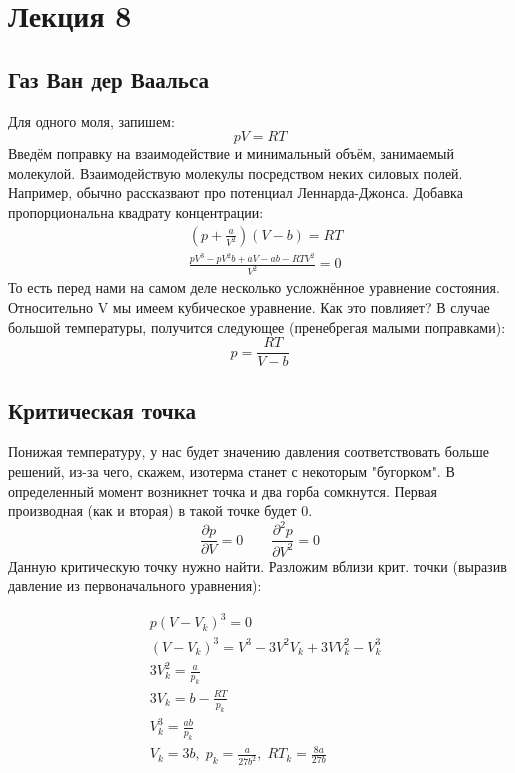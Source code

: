 \documentclass[a4paper, 12pt]{article}
\begin{document}
	\section{Лекция 8}
	\subsection{Газ Ван дер Ваальса}
	Для одного моля, запишем:
	\begin{equation*}
		pV=RT
	\end{equation*}
	Введём поправку на взаимодействие и минимальный объём, занимаемый молекулой. Взаимодействую молекулы посредством неких силовых полей. Например, обычно рассказвают про потенциал Леннарда-Джонса. Добавка пропорциональна квадрату концентрации:
	\begin{equation*}
		\begin{aligned}
			& (p+\frac{a}{V^{2}})(V-b) = RT                       \\
			& \frac{pV^{3}-pV^{2}b + aV - ab -RTV^{2}}{V^{2}} = 0 
		\end{aligned}
	\end{equation*}
	То есть перед нами на самом деле несколько усложнённое уравнение состояния. Относительно V мы имеем кубическое уравнение. Как это повлияет? В случае большой температуры, получится следующее (пренебрегая малыми поправками):
	\begin{equation*}
		p = \frac{RT}{V-b}
	\end{equation*}
	\subsection{Критическая точка}
	Понижая температуру, у нас будет значению давления соответствовать больше решений, из-за чего, скажем, изотерма станет с некоторым "бугорком". В определенный момент возникнет точка и два горба сомкнутся. Первая производная (как и вторая) в такой точке будет 0. 
	\begin{equation*}
		\frac{\partial p}{\partial V} = 0 \qquad \frac{\partial^{2} p}{\partial V^{2}} = 0
	\end{equation*}
	Данную критическую точку нужно найти. Разложим вблизи крит. точки (выразив давление из первоначального уравнения):
	
	\begin{equation*}
		\begin{aligned}
			& p(V-V_{k})^3=0                                                       \\
			& (V-V_{k})^{3} = V^{3} - 3V^{2}V_{k} +3VV_{k}^{2} - V_{k}^{3}         \\
			& 3V_{k}^{2} = \frac{a}{p_{k}}                                         \\
			& 3V_{k} = b - \frac{RT}{p_{k}}                                        \\
			& V_{k}^{3} = \frac{ab}{p_{k}}                                         \\
			& V_{k} = 3b, \; p_{k} = \frac{a}{27b^{2}}, \; RT_{k} = \frac{8a}{27b} 
		\end{aligned}
	\end{equation*}
	
\end{document}
